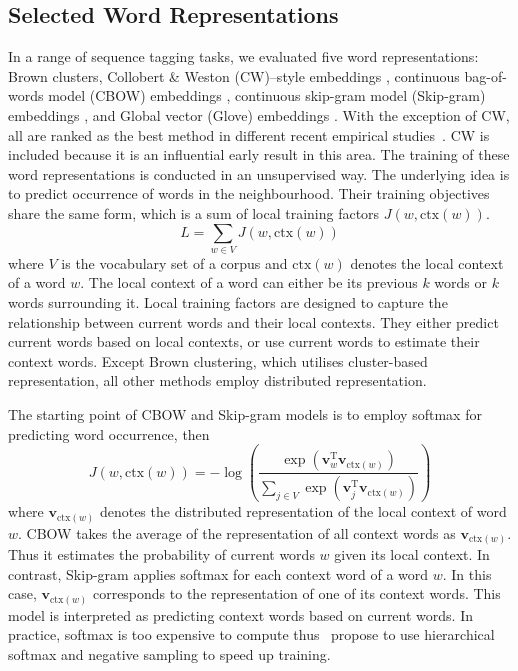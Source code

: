 \subsection{Selected Word Representations}
In a range of sequence tagging tasks, we evaluated five word representations: 
Brown clusters, Collobert \& Weston (CW)--style embeddings \cite{collobert2011natural}, 
continuous bag-of-words model (CBOW) embeddings \cite{Mikolov13}, 
continuous skip-gram model (Skip-gram) embeddings \cite{Mikolov13NIPS}, 
and Global vector (Glove) embeddings \cite{pennington2014glove}. 
With the exception of CW, all are ranked as the best method in different recent empirical studies~\cite{turian2010word,pennington2014glove}. CW is included because it is an influential early result in this area. The training of these word representations is conducted in an unsupervised way. The underlying idea is to predict occurrence of words in the neighbourhood. Their training objectives share the same form, which is a sum of local training factors $J(w, \text{ctx}(w))$. 
\begin{displaymath}
L = \sum_{w \in V} J(w, \text{ctx}(w))
\end{displaymath}
where $V$ is the vocabulary set of a corpus and $\text{ctx}(w)$ denotes the local context of a word $w$. The local context of a word can either be its previous $k$ words or $k$ words surrounding it. Local training factors are designed to capture the relationship between current words and their local contexts. They either predict current words based on local contexts, or use current words to estimate their context words. Except Brown clustering, which utilises cluster-based representation, all other methods employ distributed representation.

The starting point of CBOW and Skip-gram models is to employ softmax for predicting word occurrence, then
\begin{displaymath}
J(w, \text{ctx}(w)) = - \log \left( \frac{\exp(\mathbf{v}_w^{\text{T}} \mathbf{v}_{\text{ctx}(w)})}{ \sum_{j \in V} \exp(\mathbf{v}_j^{\text{T}} \mathbf{v}_{\text{ctx}(w)})} \right)
\end{displaymath}
where $\mathbf{v}_{\text{ctx}(w)}$ denotes the distributed representation of the local context of word $w$. CBOW takes the average of the representation of all context words as $\mathbf{v}_{\text{ctx}(w)}$. Thus it estimates the probability of current words $w$ given its local context. In contrast, Skip-gram applies softmax for each context word of a word $w$. In this case, $\mathbf{v}_{\text{ctx}(w)}$ corresponds to the representation of one of its context words. This model is interpreted as predicting context words based on current words. In practice, softmax is too expensive to compute thus~ propose to use hierarchical softmax and negative sampling to speed up training.

